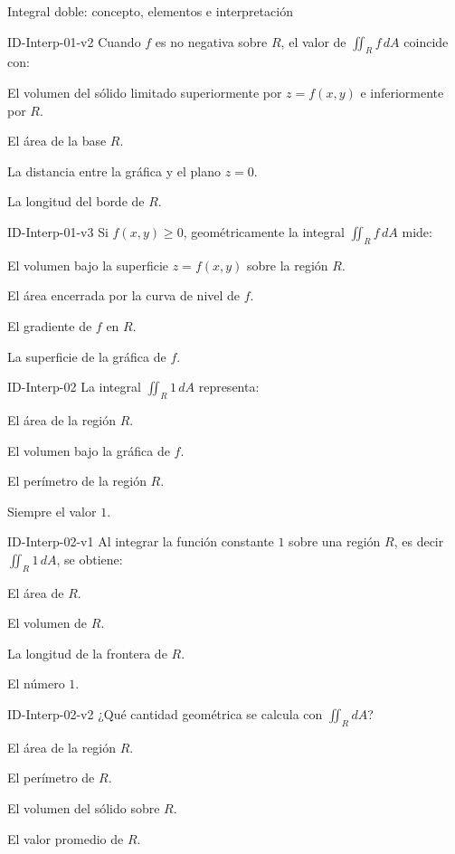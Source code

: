 \documentclass[a4,11pt]{aleph-notas}
\begin{document}
\begin{quiz}{Integral doble: concepto, elementos e interpretación}
\begin{multi}[]%
    {ID-Interp-01-v2}
    Cuando $f$ es no negativa sobre $R$, el valor de $\displaystyle\iint_R f\,dA$ coincide con:
    \item* El volumen del sólido limitado superiormente por $z=f(x,y)$ e inferiormente por $R$.
    \item El área de la base $R$.
    \item La distancia entre la gráfica y el plano $z=0$.
    \item La longitud del borde de $R$.
\end{multi}

\begin{multi}[]%
    {ID-Interp-01-v3}
    Si $f(x,y)\geq 0$, geométricamente la integral $\displaystyle\iint_R f\,dA$ mide:
    \item* El volumen bajo la superficie $z=f(x,y)$ sobre la región $R$.
    \item El área encerrada por la curva de nivel de $f$.
    \item El gradiente de $f$ en $R$.
    \item La superficie de la gráfica de $f$.
\end{multi}

\begin{multi}[]%
    {ID-Interp-02}
    La integral $\displaystyle\iint_R 1\,dA$ representa:
    \item* El área de la región $R$.
    \item El volumen bajo la gráfica de $f$.
    \item El perímetro de la región $R$.
    \item Siempre el valor $1$.
\end{multi}

\begin{multi}[]%
    {ID-Interp-02-v1}
    Al integrar la función constante $1$ sobre una región $R$, es decir $\displaystyle\iint_R 1\,dA$, se obtiene:
    \item* El área de $R$.
    \item El volumen de $R$.
    \item La longitud de la frontera de $R$.
    \item El número $1$.
\end{multi}

\begin{multi}[]%
    {ID-Interp-02-v2}
    ¿Qué cantidad geométrica se calcula con $\displaystyle\iint_R dA$?
    \item* El área de la región $R$.
    \item El perímetro de $R$.
    \item El volumen del sólido sobre $R$.
    \item El valor promedio de $R$.
\end{multi}


\end{quiz}
\end{document}
